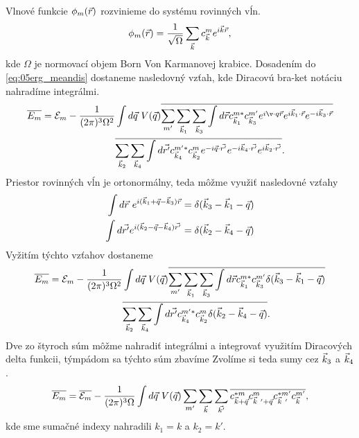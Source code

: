 Vlnové funkcie $\phi_m(\vec{r})$ rozvinieme do systému rovinných vĺn. 
\begin{align}
\label{eq:05phi}
\phi_m(\vec{r}) = \frac{1}{\sqrt{\Omega}}\sum_{\vec{k}}c_{\vec{k}}^me^{i\vec{k}\vec{r}}\text{,}
\end{align}
kde $\Omega$ je normovací objem Born Von Karmanovej krabice. Dosadením do \eqref{eq:05erg_meandis} dostaneme nasledovný vzťah, kde Diracovú bra-ket notáciu nahradíme integrálmi.
\begin{align}
\notag
\overline{E_m} = \E_m - \frac{1}{(2\pi)^3\Omega^2}&\int d\vq\ V(\vq)\overline{ \sum_{m'} \sum_{\vk_1} \sum_{\vk_3}\int d\vr c^{m*}_{\vk_1}c^{m'}_{\vk_3}e^{i\v\cdot q\vr}e^{i\vk_1\cdot \vr}e^{-i\vk_3\cdot \vr}}\\
&\overline{\sum_{\vk_2}\sum_{\vk_4}\int d\vrp c^{m'*}_{\vk_4}c^{m}_{\vk_2}e^{-i\vq\cdot \vrp}e^{-i\vk_4\cdot \vrp}e^{i\vk_2\cdot \vrp}} \text{.}
\end{align}
Priestor rovinných vĺn je ortonormálny, teda môžme využiť nasledovné vzťahy
\begin{align*}
\int d\vec{r}\ e^{i(\vec{k}_1+\vec{q}-\vec{k}_3)\vec{r}}=\delta(\vec{k}_3-\vec{k}_1-\vec{q})\\ 
\int d\vec{r'} e^{i(\vec{k}_2-\vec{q}-\vec{k}_4)\vec{r'}}=\delta(\vec{k}_2-\vec{k}_4-\vec{q})
\end{align*}
Vyžitím týchto vzťahov dostaneme
\begin{align}
\notag
\overline{E_m} = \E_m - \frac{1}{(2\pi)^3\Omega^2}&\int d\vq\ V(\vq)\overline{ \sum_{m'} \sum_{\vk_1} \sum_{\vk_3}\int d\vr c^{m*}_{\vk_1}c^{m'}_{\vk_3}\delta(\vk_3-\vk_1-\vq)}\\
&\overline{\sum_{\vk_2}\sum_{\vk_4}\int d\vrp c^{m'*}_{\vk_4}c^{m}_{\vk_2}\delta(\vk_2-\vk_4-\vq)} \text{.}
\end{align} 
Dve zo štyroch súm môžme nahradiť integrálmi a integrovať využitím Diracových delta funkcii, týmpádom sa týchto súm zbavíme Zvolíme si teda sumy cez $\vec{k}_3$ a $\vec{k}_4$.
\begin{align}
\overline{E_m}=\overline{\E_m} - \frac{1}{(2\pi)^3\Omega}\int d\vq\ V(\vq) \sum_{m'}\sum_{\vk}\sum_{\vkp}\overline{c^{*m}_{\vk+\vq}c^{m}_{\vk\ '+\vq}c^{*m'}_{\vk\ '}c^{m'}_{\vk}}\text{,}
\end{align}
kde sme sumačné indexy nahradili $k_1=k$ a $k_2=k'$. 

